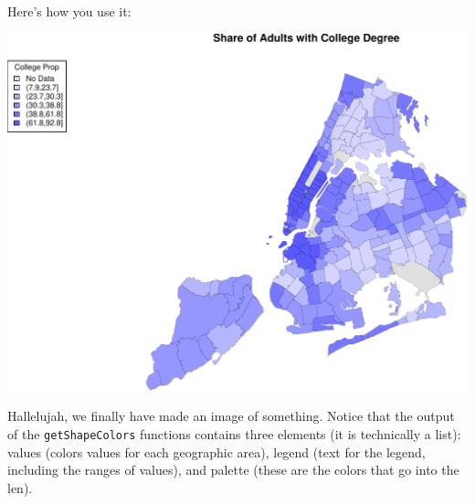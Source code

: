 \documentclass[openany]{book}
\newenvironment{Shaded}{\begin{snugshade}}{\end{snugshade}}
\newcommand{\DataTypeTok}[1]{\textcolor[rgb]{0.13,0.29,0.53}{#1}}
\newcommand{\DecValTok}[1]{\textcolor[rgb]{0.00,0.00,0.81}{#1}}
\newcommand{\FloatTok}[1]{\textcolor[rgb]{0.00,0.00,0.81}{#1}}
\newcommand{\KeywordTok}[1]{\textcolor[rgb]{0.13,0.29,0.53}{\textbf{#1}}}
\newcommand{\NormalTok}[1]{#1}
\newcommand{\OperatorTok}[1]{\textcolor[rgb]{0.81,0.36,0.00}{\textbf{#1}}}
\newcommand{\StringTok}[1]{\textcolor[rgb]{0.31,0.60,0.02}{#1}}
\begin{document}
Here's how you use it:

\begin{Shaded}
\end{Shaded}

\begin{center}\includegraphics[width=0.9\linewidth]{figs/unnamed-chunk-89-1} \end{center}

Hallelujah, we finally have made an image of something. Notice that the output of the \texttt{getShapeColors} functions contains three elements (it is technically a list): values (colors values for each geographic area), legend (text for the legend, including the ranges of values), and palette (these are the colors that go into the len).
\end{document}
